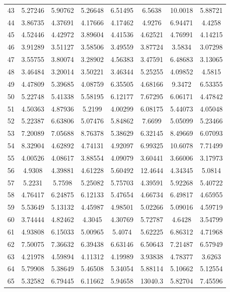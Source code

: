 \begin{figure}
\begin{tabular}{cccccccc}
43 & 5.27246 & 5.90762 & 5.26648 & 6.51495 & 6.5638 & 10.0018 & 5.88721\\
44 & 3.86735 & 4.37691 & 4.17666 & 4.17462 & 4.9276 & 6.94471 & 4.4258\\
45 & 4.52446 & 4.42972 & 3.89604 & 4.41536 & 4.62521 & 4.76991 & 4.14215\\
46 & 3.91289 & 3.51127 & 3.58506 & 3.49559 & 3.87724 & 3.5834 & 3.07298\\
47 & 3.55755 & 3.80074 & 3.28902 & 4.56383 & 3.47591 & 6.48683 & 3.13065\\
48 & 3.46484 & 3.20014 & 3.50221 & 3.46344 & 5.25255 & 4.09852 & 4.5815\\
49 & 4.47809 & 5.39685 & 4.08759 & 6.35505 & 4.68166 & 9.3472 & 6.53355\\
50 & 5.22748 & 5.41338 & 5.58195 & 6.12177 & 7.67295 & 6.06171 & 4.47842\\
51 & 4.50363 & 4.87936 & 5.2199 & 4.00299 & 6.08175 & 5.44073 & 4.05048\\
52 & 5.22387 & 6.63806 & 5.07476 & 5.84862 & 7.6699 & 5.05099 & 5.23466\\
53 & 7.20089 & 7.05688 & 8.76378 & 5.38629 & 6.32145 & 8.49669 & 6.07093\\
54 & 8.32904 & 4.62892 & 4.74131 & 4.92097 & 6.99325 & 10.6078 & 7.71499\\
55 & 4.00526 & 4.08617 & 3.88554 & 4.09079 & 3.60441 & 3.66006 & 3.17973\\
56 & 4.9308 & 4.39881 & 4.61228 & 5.60492 & 12.4644 & 4.34345 & 5.0814\\
57 & 5.2231 & 5.7598 & 5.25082 & 5.75703 & 4.39591 & 5.92268 & 5.40722\\
58 & 4.76417 & 6.24875 & 6.12133 & 5.47654 & 4.66734 & 6.49817 & 4.65955\\
59 & 5.53649 & 5.13132 & 4.45987 & 4.98501 & 5.02266 & 5.09016 & 4.59719\\
60 & 3.74444 & 4.82462 & 4.3045 & 4.30769 & 5.72787 & 4.6428 & 3.54799\\
61 & 4.93808 & 6.15033 & 5.00965 & 5.4074 & 5.62225 & 6.86312 & 4.71968\\
62 & 7.50075 & 7.36632 & 6.39438 & 6.63146 & 6.50643 & 7.21487 & 6.57949\\
63 & 4.21978 & 4.59894 & 4.11312 & 4.19989 & 3.93838 & 4.78377 & 3.6263\\
64 & 5.79908 & 5.38649 & 5.46508 & 5.34054 & 5.88114 & 5.10662 & 5.12554\\
65 & 5.32582 & 6.79445 & 6.11662 & 5.94658 & 13040.3 & 5.82704 & 7.45596\\

\end{tabular}
\end{figure}
